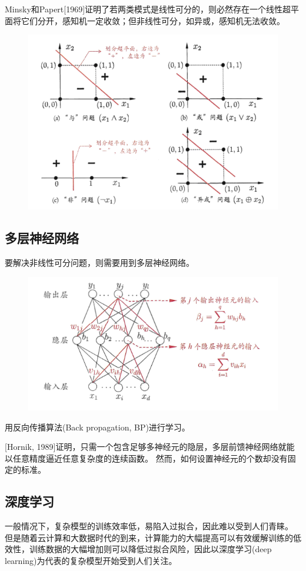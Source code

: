 Minsky和Papert[1969]证明了若两类模式是线性可分的，则必然存在一个线性超平面将它们分开，感知机一定收敛；但非线性可分，如异或，感知机无法收敛。
\begin{figure}[H]
\centering
\includegraphics[width=0.7\linewidth]{fig/linear-separable.png}
\end{figure}

\subsection{多层神经网络}
要解决非线性可分问题，则需要用到多层神经网络。
\begin{figure}[H]
\centering
\includegraphics[width=0.6\linewidth]{fig/BP.png}
\end{figure}

用反向传播算法(Back propagation, BP)进行学习。

[Hornik, 1989]证明，只需一个包含足够多神经元的隐层，多层前馈神经网络就能以任意精度逼近任意复杂度的连续函数。
然而，如何设置神经元的个数却没有固定的标准。

\subsection{深度学习}
一般情况下，复杂模型的训练效率低，易陷入过拟合，因此难以受到人们青睐。
但是随着云计算和大数据时代的到来，计算能力的大幅提高可以有效缓解训练的低效性，训练数据的大幅增加则可以降低过拟合风险，因此以深度学习(deep learning)为代表的复杂模型开始受到人们关注。

